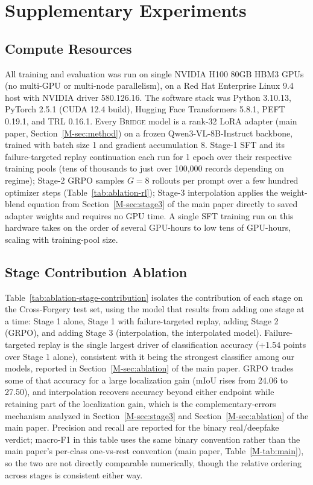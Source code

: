 \documentclass[10pt,twocolumn,letterpaper]{article}
\newcommand{\bridge}{\textsc{Bridge}}
\begin{document}
\section{Supplementary Experiments}

\subsection{Compute Resources}
All training and evaluation was run on single NVIDIA H100 80GB HBM3 GPUs (no multi-GPU or multi-node parallelism), on a Red Hat Enterprise Linux 9.4 host with NVIDIA driver 580.126.16. The software stack was Python 3.10.13, PyTorch 2.5.1 (CUDA 12.4 build), Hugging Face Transformers 5.8.1, PEFT 0.19.1, and TRL 0.16.1. Every \bridge{} model is a rank-32 LoRA adapter (main paper, Section~\ref{M-sec:method}) on a frozen Qwen3-VL-8B-Instruct backbone, trained with batch size 1 and gradient accumulation 8. Stage-1 SFT and its failure-targeted replay continuation each run for 1 epoch over their respective training pools (tens of thousands to just over 100{,}000 records depending on regime); Stage-2 GRPO samples $G{=}8$ rollouts per prompt over a few hundred optimizer steps (Table~\ref{tab:ablation-rl}); Stage-3 interpolation applies the weight-blend equation from Section~\ref{M-sec:stage3} of the main paper directly to saved adapter weights and requires no GPU time. A single SFT training run on this hardware takes on the order of several GPU-hours to low tens of GPU-hours, scaling with training-pool size.

\subsection{Stage Contribution Ablation}
Table~\ref{tab:ablation-stage-contribution} isolates the contribution of each stage on the Cross-Forgery test set, using the model that results from adding one stage at a time: Stage 1 alone, Stage 1 with failure-targeted replay, adding Stage 2 (GRPO), and adding Stage 3 (interpolation, the interpolated model). Failure-targeted replay is the single largest driver of classification accuracy (+1.54 points over Stage 1 alone), consistent with it being the strongest classifier among our models, reported in Section~\ref{M-sec:ablation} of the main paper. GRPO trades some of that accuracy for a large localization gain (mIoU rises from 24.06 to 27.50), and interpolation recovers accuracy beyond either endpoint while retaining part of the localization gain, which is the complementary-errors mechanism analyzed in Section~\ref{M-sec:stage3} and Section~\ref{M-sec:ablation} of the main paper. Precision and recall are reported for the binary real/deepfake verdict; macro-F1 in this table uses the same binary convention rather than the main paper's per-class one-vs-rest convention (main paper, Table~\ref{M-tab:main}), so the two are not directly comparable numerically, though the relative ordering across stages is consistent either way.
\end{document}
